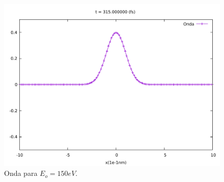 \begin{figure}[H]
	\centering
	\includegraphics[scale=0.5]{../img/ej7-17.pdf}
	\caption{Onda para $E_o = 150 eV$.}
	\label{ej7-17}
\end{figure}

